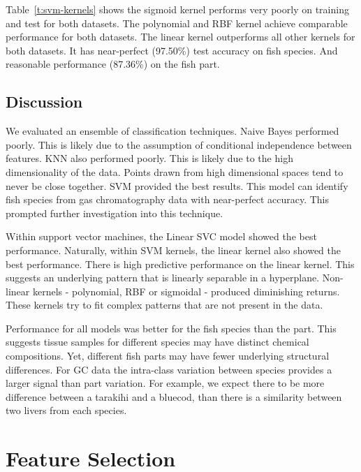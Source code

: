 \documentclass[runningheads]{llncs}
\begin{document}
Table~\ref{t:svm-kernels} shows the sigmoid kernel performs very poorly on training and test for both datasets.
The polynomial and RBF kernel achieve comparable performance for both datasets.
The linear kernel outperforms all other kernels for both datasets.
It has near-perfect (97.50\%) test accuracy on fish species.
And reasonable performance (87.36\%) on the fish part.

\subsection{Discussion}
\label{sec:results-classification-discussion}

We evaluated an ensemble of classification techniques.
Naive Bayes performed poorly.
This is likely due to the assumption of conditional independence between features.
KNN also performed poorly. This is likely due to the high dimensionality of the data.
Points drawn from high dimensional spaces tend to never be close together.
SVM provided the best results.
This model can identify fish species from gas chromatography data with near-perfect accuracy.
This prompted further investigation into this technique.

Within support vector machines, the Linear SVC model showed the best performance.
Naturally, within SVM kernels, the linear kernel also showed the best performance.
There is high predictive performance on the linear kernel.
This suggests an underlying pattern that is linearly separable in a hyperplane.
Non-linear kernels - polynomial, RBF or sigmoidal - produced diminishing returns.
These kernels try to fit complex patterns that are not present in the data.

Performance for all models was better for the fish species than the part.
This suggests tissue samples for different species may have distinct chemical compositions.
Yet, different fish parts may have fewer underlying structural differences.
For GC data the intra-class variation between species provides a larger signal than part variation.
For example, we expect there to be more difference between a tarakihi and a bluecod, than there is a similarity between two livers from each species.

\section{Feature Selection}

\end{document}
